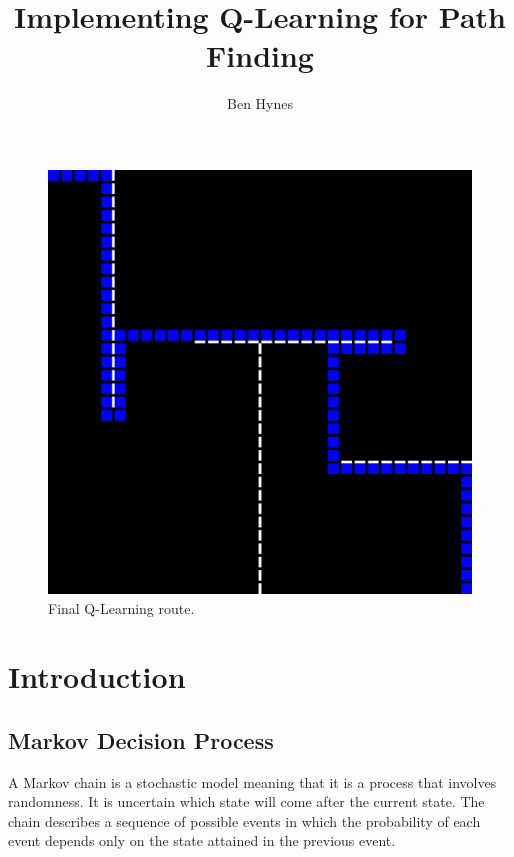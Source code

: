 \documentclass[]{article}
\title{Implementing Q-Learning for Path Finding}
\author{Ben Hynes}
\begin{document}
	
\maketitle

\begin{figure}[H]
	\includegraphics[scale=0.05]{1ma}
	\centering
	\caption{Final Q-Learning route.}
\end{figure}

\clearpage

\section{Introduction}

\subsection{Markov Decision Process}

A Markov chain is a stochastic model meaning that it is a process that involves randomness. It is uncertain which state will come after the current state. The chain describes a sequence of possible events in which the probability of each event depends only on the state attained in the previous event. 
\end{document}

